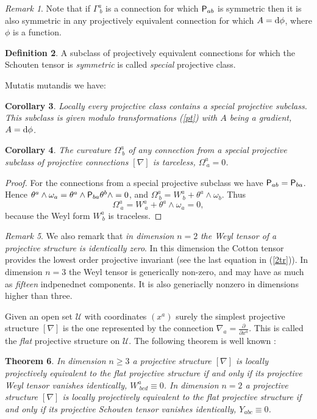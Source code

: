 \documentclass[letterpaper]{amsart}
\newtheorem{theorem}{Theorem}[section]
\newtheorem{corollary}[theorem]{Corollary}
\theoremstyle{definition}
\newtheorem{definition}[theorem]{Definition}
\theoremstyle{remark}
\newtheorem{remark}[theorem]{Remark}
\newcommand{\dz}{\wedge}
\newcommand{\der}{{\rm d}}
\newcommand{\Rho}{{\mbox{\sf P}}}
\begin{document}
\begin{remark}\label{ko}
Note that if $\Gamma^{a}_{~b}$ is a connection for which $\Rho_{ab}$
is symmetric then it is also symmetric in any projectively equivalent
connection for which $A=\der\phi$, where $\phi$ is a function.
\end{remark}
\begin{definition}
A subclass of projectively equivalent connections for which the
Schouten tensor is \emph{symmetric} is called \emph{special}
projective class.
\end{definition}
Mutatis mutandis we have: 
\begin{corollary}
Locally every projective class contains a \emph{special}
projective subclass. This subclass is given modulo transformations
(\ref{pt}) with $A$ being a gradient, $A=\der\phi$.
\end{corollary}
\begin{corollary}\label{kor}
The curvature $\Omega^a_{~b}$ of any connection from a special
projective subclass of projective connections $[\nabla]$ is tarceless, $\Omega^a_{~a}=0$. 
\end{corollary}
\begin{proof}
For the connections from a special projective subclass we have
$\Rho_{ab}=\Rho_{ba}$. Hence
$\theta^a\dz \omega_a=\theta^a\dz\Rho_{ba}\theta^b\dz=0$, and
$\Omega^a_{~b}=W^a_{~b}+\theta^a\dz\omega_b$. Thus
$$\Omega^a_{~a}=W^a_{~a}+\theta^a\dz\omega_a=0,$$ because 
the Weyl form $W^a_{~b}$ is traceless.   
\end{proof}
\begin{remark}
We also remark that \emph{in dimension} $n=2$ \emph{the Weyl
tensor of a projective structure is identically zero}. In this
dimension the Cotton tensor provides the lowest order projective
invariant (see the last equation in (\ref{2tr})). In
dimension $n=3$ the Weyl tensor is generically non-zero, and may have as much as
\emph{fifteen} indpenednet components. It is also generiaclly nonzero
in dimensions higher than three.
\end{remark}

Given an open set $\mathcal U$ with coordinates $(x^a)$ surely the simplest
projective structure $[\nabla]$ is the one represented by the
connection $\nabla_a=\frac{\partial}{\partial x^a}$. This is called
the \emph{flat} projective structure on $\mathcal U$. The following
theorem is well known \cite{car,tom}:
\begin{theorem}
In dimension $n\geq 3$ a projective structure $[\nabla]$ is locally
projectively equivalent to the flat projective structure if and only
if its projective Weyl tensor vanishes identically, $W^a_{~bcd}\equiv 0$. In dimension $n=2$
a projective structure $[\nabla]$ is locally
projectively equivalent to the flat projective structure if and only
if its projective Schouten tensor vanishes identically, $Y_{abc}\equiv 0$.
\end{theorem}
\end{document}
